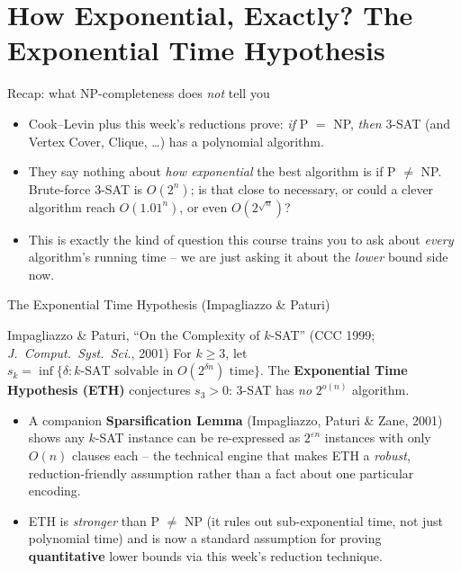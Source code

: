 \documentclass[11pt,aspectratio=169]{beamer}
\begin{document}
\section{How Exponential, Exactly? The Exponential Time Hypothesis}

\begin{frame}{Recap: what NP-completeness does \emph{not} tell you}
  \begin{itemize}
    \item Cook--Levin plus this week's reductions prove: \emph{if} P $=$ NP, \emph{then}
    3-SAT (and Vertex Cover, Clique, \dots) has a polynomial algorithm.
    \item They say nothing about \emph{how exponential} the best algorithm is if
    P $\neq$ NP. Brute-force 3-SAT is $O(2^n)$; is that close to necessary, or could a
    clever algorithm reach $O(1.01^n)$, or even $O(2^{\sqrt{n}})$?
    \item This is exactly the kind of question this course trains you to ask about
    \emph{every} algorithm's running time -- we are just asking it about the
    \emph{lower} bound side now.
  \end{itemize}
\end{frame}

\begin{frame}{The Exponential Time Hypothesis (Impagliazzo \& Paturi)}
  \begin{block}{Impagliazzo \& Paturi, ``On the Complexity of $k$-SAT'' (CCC 1999;
  \emph{J.\ Comput.\ Syst.\ Sci.}, 2001)}
    For $k \ge 3$, let $s_k = \inf\{\delta : k\text{-SAT solvable in } O(2^{\delta n})
    \text{ time}\}$. The \textbf{Exponential Time Hypothesis (ETH)} conjectures
    $s_3 > 0$: 3-SAT has \emph{no} $2^{o(n)}$ algorithm.
  \end{block}
  \begin{itemize}
    \item A companion \textbf{Sparsification Lemma} (Impagliazzo, Paturi \& Zane, 2001)
    shows any $k$-SAT instance can be re-expressed as $2^{\varepsilon n}$ instances with
    only $O(n)$ clauses each -- the technical engine that makes ETH a \emph{robust},
    reduction-friendly assumption rather than a fact about one particular encoding.
    \item ETH is \emph{stronger} than P $\neq$ NP (it rules out sub-exponential time,
    not just polynomial time) and is now a standard assumption for proving
    \textbf{quantitative} lower bounds via this week's reduction technique.
  \end{itemize}
\end{frame}
\end{document}

